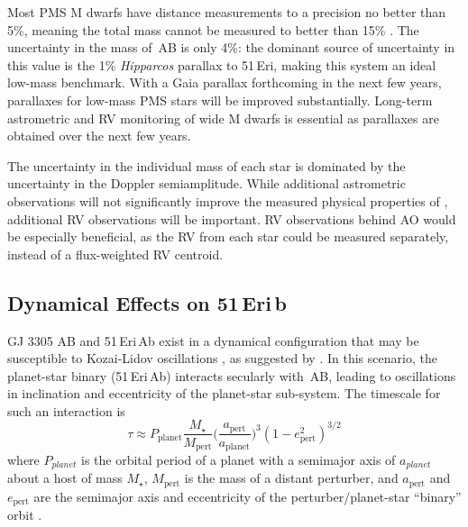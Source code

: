 Most PMS M dwarfs have distance measurements to a precision no better than 5\%, meaning the 
total mass cannot be measured to better than 15\% \citep[e.g.][]{Shkolnik12}.
The uncertainty in the mass of \thisstarsix\,AB is only 4\%: the dominant source
of uncertainty in this value is the 1\% \textit{Hipparcos} parallax
to 51\,Eri,
making this system an ideal low-mass benchmark.
With a Gaia parallax forthcoming in the next few years, parallaxes for low-mass PMS stars will
be improved substantially.
Long-term astrometric and RV monitoring of wide M dwarfs is essential
as parallaxes are obtained over the next few years.

The uncertainty in the individual mass of each star is dominated by the uncertainty in the 
Doppler semiamplitude. 
While additional astrometric observations will not significantly improve the measured 
physical properties of \thisstarsix, additional RV observations will be important.
RV observations behind AO would be especially beneficial, as the RV from each 
star could be measured separately, instead of a flux-weighted RV centroid.




\subsection{Dynamical Effects on 51\,Eri\,b}


GJ 3305 AB and 51\,Eri\,Ab exist in a
dynamical configuration that may be susceptible to Kozai-Lidov
oscillations
\citep{Kozai62,Lidov62}, as suggested by \citet{Macintosh15}. 
In this scenario, the
planet-star binary (51\,Eri\,Ab) interacts secularly with \thisstarsix\,AB, 
leading to oscillations in inclination and eccentricity of the planet-star
sub-system. The timescale for such an interaction is
\begin{equation}
\tau \approx
P_\textrm{planet}\frac{M_\star}{M_\textrm{pert}}\bigg(\frac{a_\textrm{pert}}{a_\textrm{planet}}\bigg)^3(1-e_\textrm{pert}^2)^{3/2}
\end{equation}
where $P_{planet}$ is the orbital period of a planet with a semimajor
axis of $a_{planet}$ about a host of mass $M_\star$,
$M_\textrm{pert}$ is
the mass of a distant perturber, and $a_\textrm{pert}$ and $e_\textrm{pert}$
are the semimajor axis
and eccentricity of the perturber/planet-star ``binary'' orbit 
\citep[see e.g.][]{Holman97}.


